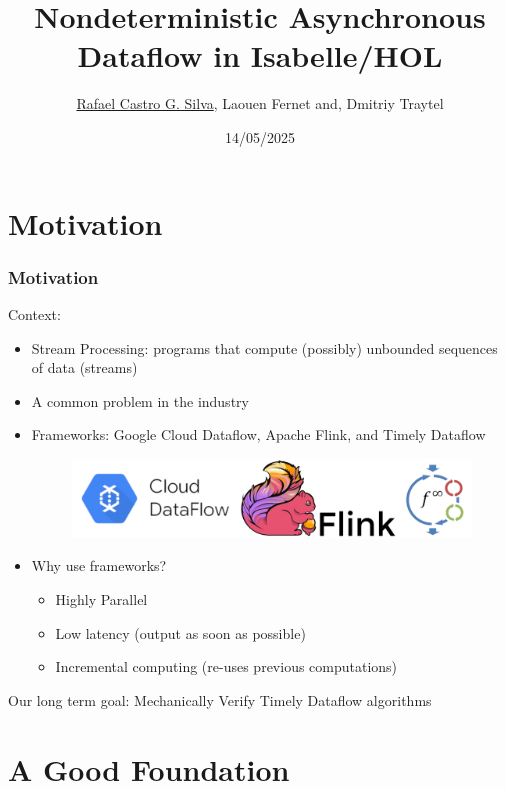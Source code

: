 \documentclass[fleqn,aspectratio=169,10pt]{beamer}
\title[Nondeterministic Asynchronous Dataflow in Isabelle/HOL]{Nondeterministic Asynchronous Dataflow in Isabelle/HOL}
\author[\underline{Rafael}, Laouen and, Dmitriy]{
  \underline{Rafael Castro G. Silva}, Laouen Fernet and,  Dmitriy Traytel\\\medskip
  }
\date{14/05/2025}
\institute[UCPH]{
  Department of Computer Science \\
  University of Copenhagen}
\begin{document}

\begin{frame}
  \titlepage
\end{frame}

\section{Motivation}

\begin{frame}[fragile]
  \frametitle{Motivation}
  \begin{block}{Context:}
  \begin{itemize}
    \item Stream Processing: programs that compute (possibly) unbounded sequences of data (streams)
    \item A common problem in the industry
    \item Frameworks: Google Cloud Dataflow, Apache Flink, and Timely Dataflow
          \begin{figure}
            \centering
            \includegraphics[scale=0.1]{all}
          \end{figure}
    \item Why use frameworks?
          \begin{itemize}
            \item Highly Parallel
            \item Low latency (output as soon as possible)
            \item Incremental computing (re-uses previous computations)
          \end{itemize}
  \end{itemize}
  \pause
  \end{block}
  \begin{block}{Our long term goal:}
    Mechanically Verify Timely Dataflow algorithms
  \end{block}
\end{frame}

\section{A Good Foundation}
\end{document}
